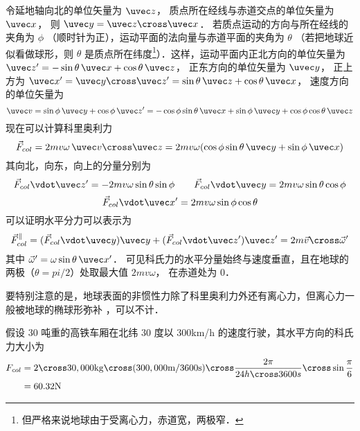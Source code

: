 
令延地轴向北的单位矢量为 $\uvec z$， 质点所在经线与赤道交点的单位矢量为 $\uvec x$， 则 $\uvec y = \uvec z\cross\uvec x$． 若质点运动的方向与所在经线的夹角为 $\phi$ （顺时针为正），运动平面的法向量与赤道平面的夹角为 $\theta$ （若把地球近似看做球形，则 $\theta$ 是质点所在纬度\footnote{但严格来说地球由于受离心力，赤道宽，两极窄．}）．这样，运动平面内正北方向的单位矢量为 $\uvec z' = -\sin\theta \,\uvec x + \cos\theta\,\uvec z$， 正东方向的单位矢量为 $\uvec y$， 正上方为 $\uvec x' = \uvec y\cross\uvec z' = \sin\theta \,\uvec z + \cos\theta\,\uvec x$， 速度方向的单位矢量为
\begin{equation}
\uvec v = \sin\phi\,\uvec y + \cos\phi\,\uvec z' = -\cos\phi\sin\theta \,\uvec x + \sin\phi\,\uvec y+\cos\phi\cos\theta\,\uvec z
\end{equation}
现在可以计算科里奥利力
\begin{equation}
\vec F_{col} = 2mv\omega\,\uvec v\cross\uvec z = 2mv\omega (\cos\phi\sin\theta\,\uvec y + \sin\phi\,\uvec x)
\end{equation}
其向北，向东，向上的分量分别为
\begin{equation}
\vec F_{col}\vdot\uvec z' = -2mv\omega\sin\theta\sin\phi
\qquad
\vec F_{col}\vdot\uvec y = 2mv\omega\sin\theta\cos\phi
\end{equation}
\begin{equation}
\vec F_{col}\vdot\uvec x' = 2mv\omega\sin\phi\cos\theta
\end{equation}
可以证明水平分力可以表示为
\begin{equation}
\vec F_{col}^{\|} = (\vec F_{col}\vdot\uvec y)\uvec y + (\vec F_{col}\vdot\uvec z')\uvec z' = 2m\vec v\cross\vec\omega'
\end{equation}
其中 $\vec\omega' = \omega\sin\theta\,\uvec x'$． 可见科氏力的水平分量始终与速度垂直，且在地球的两极（$\theta = pi/2$）处取最大值 $2mv\omega$， 在赤道处为 0．

要特别注意的是，地球表面的非惯性力除了科里奥利力外还有离心力，但离心力一般被地球的椭球形弥补%
，可以不计．

\begin{exam}{}
假设 30 吨重的高铁车厢在北纬 30 度以 300km/h 的速度行驶，其水平方向的科氏力大小为
\begin{equation}\begin{aligned}
F_{col} &= 2\cross30,000\mathrm{kg}\cross(300,000\mathrm{m}/3600\mathrm{s})\cross\frac{2\pi}{24h\cross3600s}\cross\sin\frac{\pi}{6} \\
&= 60.32\mathrm{N}
\end{aligned}\end{equation}
\end{exam}

